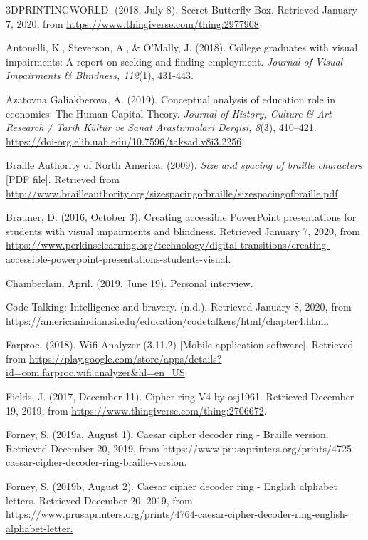 \documentclass[11.5pt]{sig-alternate} %
\begin{document}
\begin{hangparas}{0.25in}{1}

3DPRINTINGWORLD. (2018, July 8). Secret Butterfly Box. Retrieved January 7, 2020, from \url{https://www.thingiverse.com/thing:2977908}

Antonelli, K., Steverson, A., \& O’Mally, J. (2018). College graduates with visual impairments: A report on seeking and finding employment. \textit{Journal of Visual Impairments \& Blindness, 112}(1), 431-443.

Azatovna Galiakberova, A. (2019). Conceptual analysis of education role in economics: The Human Capital Theory. \textit{Journal of History, Culture \& Art Research / Tarih Kültür ve Sanat Arastirmalari Dergisi, 8}(3), 410–421. \url{https://doi-org.elib.uah.edu/10.7596/taksad.v8i3.2256}

Braille Authority of North America. (2009). \textit{Size and spacing of braille characters} [PDF file]. Retrieved from \url{http://www.brailleauthority.org/sizespacingofbraille/sizespacingofbraille.pdf}

Brauner, D. (2016, October 3). Creating accessible PowerPoint presentations for students with visual impairments and blindness. Retrieved January 7, 2020, from \url{https://www.perkinselearning.org/technology/digital-transitions/creating-accessible-powerpoint-presentations-students-visual}.

Chamberlain, April. (2019, June 19). Personal interview.

Code Talking: Intelligence and bravery. (n.d.). Retrieved January 8, 2020, from \url{https://americanindian.si.edu/education/codetalkers/html/chapter4.html}.

Farproc. (2018). Wifi Analyzer (3.11.2) [Mobile application software]. Retrieved from \url{https://play.google.com/store/apps/details?id=com.farproc.wifi.analyzer\&hl=en\_US}

Fields, J. (2017, December 11). Cipher ring V4 by osj1961. Retrieved December 19, 2019, from \url{https://www.thingiverse.com/thing:2706672}.

Forney, S. (2019a, August 1). Caesar cipher decoder ring - Braille version. Retrieved December 20, 2019, from https://www.prusaprinters.org/prints/4725-caesar-cipher-decoder-ring-braille-version.

Forney, S. (2019b, August 2). Caesar cipher decoder ring - English alphabet letters. Retrieved December 20, 2019, from \url{https://www.prusaprinters.org/prints/4764-caesar-cipher-decoder-ring-english-alphabet-letter.}


\end{hangparas}
\end{document}
